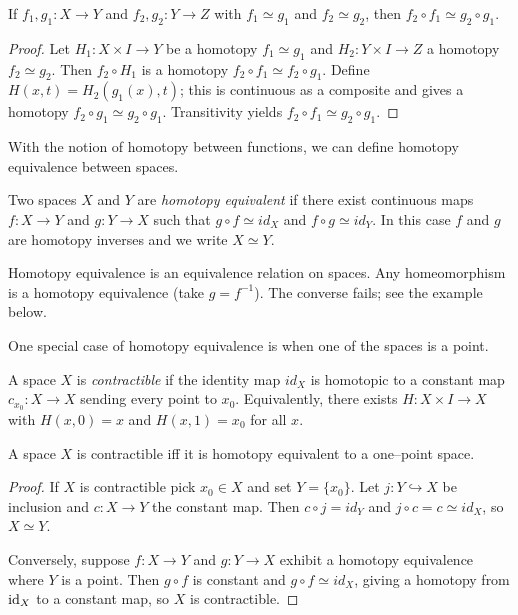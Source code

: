 \begin{proposition}
If $f_1,g_1\colon X\to Y$ and $f_2,g_2\colon Y\to Z$ with $f_1\simeq g_1$ and $f_2\simeq g_2$, then $f_2\circ f_1\simeq g_2\circ g_1$.
\end{proposition}

\begin{proof}
Let $H_1\colon X\times I\to Y$ be a homotopy $f_1\simeq g_1$ and $H_2\colon Y\times I\to Z$ a homotopy $f_2\simeq g_2$. Then $f_2\circ H_1$ is a homotopy $f_2\circ f_1\simeq f_2\circ g_1$. Define $H(x,t)=H_2(g_1(x),t)$; this is continuous as a composite and gives a homotopy $f_2\circ g_1\simeq g_2\circ g_1$. Transitivity yields $f_2\circ f_1\simeq g_2\circ g_1$.
\end{proof}

With the notion of homotopy between functions, we can define homotopy equivalence between spaces.

\begin{definition}
Two spaces $X$ and $Y$ are \emph{homotopy equivalent} if there exist continuous maps $f\colon X\to Y$ and $g\colon Y\to X$ such that $g\circ f\simeq id_X$ and $f\circ g\simeq id_Y$. In this case $f$ and $g$ are homotopy inverses and we write $X\simeq Y$.
\end{definition}

\begin{remark}
Homotopy equivalence is an equivalence relation on spaces. Any homeomorphism is a homotopy equivalence (take $g=f^{-1}$). The converse fails; see the example below.
\end{remark}

One special case of homotopy equivalence is when one of the spaces is a point.

\begin{definition}
A space $X$ is \emph{contractible} if the identity map $id_X$ is homotopic to a constant map $c_{x_0}\colon X\to X$ sending every point to $x_0$. Equivalently, there exists $H\colon X\times I\to X$ with $H(x,0)=x$ and $H(x,1)=x_0$ for all $x$. 
\end{definition}

\begin{theorem}
A space $X$ is contractible iff it is homotopy equivalent to a one--point space.
\end{theorem}

\begin{proof}
If $X$ is contractible pick $x_0\in X$ and set $Y=\{x_0\}$. Let $j\colon Y\hookrightarrow X$ be inclusion and $c\colon X\to Y$ the constant map. Then $c\circ j=id_Y$ and $j\circ c=c\simeq id_X$, so $X\simeq Y$.

Conversely, suppose $f\colon X\to Y$ and $g\colon Y\to X$ exhibit a homotopy equivalence where $Y$ is a point. Then $g\circ f$ is constant and $g\circ f\simeq id_X$, giving a homotopy from $\text{id}_X$ to a constant map, so $X$ is contractible.
\end{proof}

